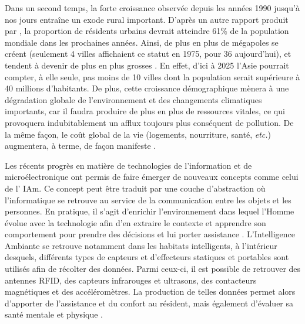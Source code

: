 Dans un second temps, la forte croissance observée depuis les années 1990 jusqu’à nos jours entraîne un exode rural important. D’après un autre rapport produit par \cite{UnitedNations2017a}, la proportion de résidents urbains devrait atteindre 61\% de la population mondiale dans les prochaines années. Ainsi, de plus en plus de mégapoles se créent (seulement 4 villes affichaient ce statut en 1975, pour 36 aujourd’hui), et tendent à devenir de plus en plus grosses \citep{UnitedNations2017a}. En effet, d’ici à 2025 l’Asie pourrait compter, à elle seule, pas moins de 10 villes dont la population serait supérieure à 40 millions d’habitants. De plus, cette croissance démographique mènera à une dégradation globale de l’environnement et des changements climatiques importants, car il faudra produire de plus en plus de ressources vitales, ce qui provoquera indubitablement un afflux toujours plus conséquent de pollution. De la même façon, le coût global de la vie (logements, nourriture, santé, \textit{etc.}) augmentera, à terme, de façon manifeste \citep{UnitedNations2017a}.

Les récents progrès en matière de technologies de l’information et de microélectronique ont permis de faire émerger de nouveaux concepts comme celui de l’ \ac{IAm}. Ce concept peut être traduit par une couche d’abstraction où l’informatique se retrouve au service de la communication entre les objets et les personnes. En pratique, il s’agit d’enrichir l’environnement dans lequel l’Homme évolue avec la technologie afin d’en extraire le contexte et apprendre son comportement pour prendre des décisions et lui porter assistance \citep{Sadri2011}. L’Intelligence Ambiante se retrouve notamment dans les habitats intelligents, à l’intérieur desquels, différents types de capteurs et d’effecteurs statiques et portables sont utilisés afin de récolter des données. Parmi ceux-ci, il est possible de retrouver des antennes RFID, des capteurs infrarouges et ultrasons, des contacteurs magnétiques et des accéléromètres. La production de telles données permet alors d’apporter de l’assistance et du confort au résident, mais également d’évaluer sa santé mentale et physique \citep{Rashidi2013, Haux2016, Harris2016, Johnson2018}.

